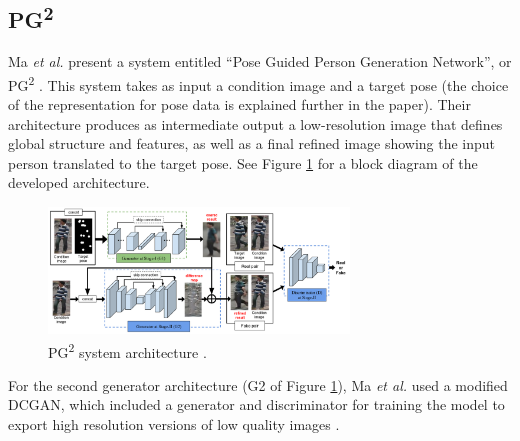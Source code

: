 \documentclass[letterpaper]{article} %
\begin{document}
\subsection{PG\textsuperscript{2}}
\label{subsubsec:pg2}
Ma \textit{et al.} 
present a system entitled
``Pose Guided Person Generation Network'', or PG\textsuperscript{2}
\cite{pose_guided_image_generation}.
This system takes as input a condition image and a target pose
(the choice of the representation for pose data is explained further in the
paper). Their architecture produces as intermediate output a low-resolution
image that defines global structure and features, as well as a final refined
image showing the input person translated to the target pose.
See Figure \ref{fig:pose_guided} for a block diagram of the developed architecture.

\begin{figure}[htbp]
\centerline{\includegraphics[width=8cm]{pose_guided.png}}
\caption{PG\textsuperscript{2} system architecture \cite{pose_guided_image_generation}.}
\label{fig:pose_guided}
\end{figure}

For the second generator architecture (G2 of Figure \ref{fig:pose_guided}),
Ma \textit{et al.} used a modified DCGAN, which included
a generator and discriminator for training the model to export
high resolution versions of low quality images \cite{unsupervised_learning}.
%
\end{document}
